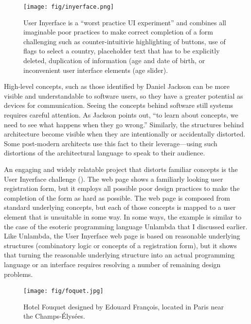 \begin{figure}
\centering
\texttt{[image: fig/inyerface.png]}
\caption{User Inyerface is a ``worst practice UI experiment'' and combines all imaginable
poor practices to make correct completion of a form challenging such as counter-intuitivie
highlighting of buttons, use of flags to select a country, placeholder text that has to be
explicitly deleted, duplication of information (age and date of birth, or inconvenient user
interface elements (age slider).}
\label{fig:inyerface}
\end{figure}

High-level concepts, such as those identified by Daniel Jackson can be more visible and
understandable to software users, so they have a greater potential as devices for communication.
Seeing the concepts behind software still systems requires careful attention. As Jackson points
out, ``to learn about concepts, we need to see what happens when they go wrong.''
Similarly, the structures behind architecture become visible when they are intentionally or accidentally
distorted. Some post-modern architects use this fact to their leverage---using such
distortions of the architectural language to speak to their audience.

An engaging and widely relatable project that distorts familiar concepts is the User
Inyerface challenge (). The web page shows a familiarly looking
user registration form, but it employs all possible poor design practices to make the completion
of the form as hard as possible. The web page is composed from standard underlying concepts,
but each of those concepts is mapped to a user element that is unsuitable in some way.
In some ways, the example is similar to the case of the esoteric programming language Unlambda
that I discussed earlier. Like Unlambda, the User Inyerface web page is based on reasonable
underlying structures (combinatory logic or concepts of a registration form), but it shows that
turning the reasonable underlying structure into an actual programming language or an interface
requires resolving a number of remaining design problems.

\begin{figure}
\centering
\vspace{-1em}
\texttt{[image: fig/foquet.jpg]}
\caption{Hotel Fouquet designed by Edouard François, located in Paris near the Champs-Élysées.}
\label{fig:hotel}
\end{figure}

